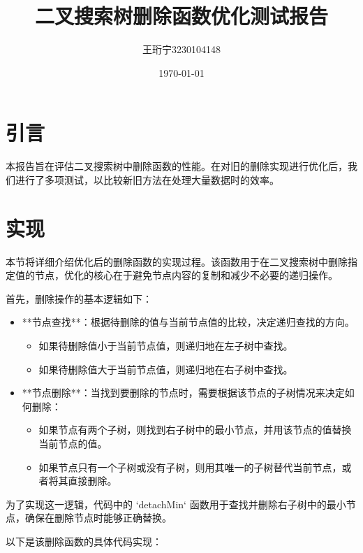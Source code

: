 \documentclass{article}
\title{二叉搜索树删除函数优化测试报告}
\author{王珩宁3230104148}
\date{\today}
\begin{document}
\maketitle

\section{引言}
本报告旨在评估二叉搜索树中删除函数的性能。在对旧的删除实现进行优化后，我们进行了多项测试，以比较新旧方法在处理大量数据时的效率。
\section{实现}

本节将详细介绍优化后的删除函数的实现过程。该函数用于在二叉搜索树中删除指定值的节点，优化的核心在于避免节点内容的复制和减少不必要的递归操作。

首先，删除操作的基本逻辑如下：
\begin{itemize}
    \item **节点查找**：根据待删除的值与当前节点值的比较，决定递归查找的方向。
    \begin{itemize}
        \item 如果待删除值小于当前节点值，则递归地在左子树中查找。
        \item 如果待删除值大于当前节点值，则递归地在右子树中查找。
    \end{itemize}
    
    \item **节点删除**：当找到要删除的节点时，需要根据该节点的子树情况来决定如何删除：
    \begin{itemize}
        \item 如果节点有两个子树，则找到右子树中的最小节点，并用该节点的值替换当前节点的值。
        \item 如果节点只有一个子树或没有子树，则用其唯一的子树替代当前节点，或者将其直接删除。
    \end{itemize}
\end{itemize}

为了实现这一逻辑，代码中的 `detachMin` 函数用于查找并删除右子树中的最小节点，确保在删除节点时能够正确替换。

以下是该删除函数的具体代码实现：
\end{document}
